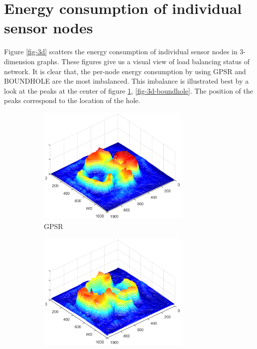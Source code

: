 \section{Energy consumption of individual sensor nodes}
Figure \ref{fig-3d} scatters the energy consumption of individual sensor nodes in 3-dimension graphs. These figures give us a visual view of load balancing status of network. It is clear that, the per-node energy consumption by using GPSR and BOUNDHOLE are the most imbalanced. This imbalance is illustrated best by a look at the peaks at the center of figure \ref{fig-3d-gpsr}, \ref{fig-3d-boundhole}. The position of the peaks correspond to the location of the hole.
\begin{figure}[!htb]
\centering
\begin{subfigure}{0.5\textwidth}
  \centering
  \includegraphics[width=0.8\textwidth]{Chapter7/Chapter7Figs/gpsr-energy.eps}
  \caption{GPSR}
  \label{fig-3d-gpsr}
\end{subfigure}%
\begin{subfigure}{0.5\textwidth}
  \centering
  \includegraphics[width=0.8\textwidth]{Chapter7/Chapter7Figs/boundhole-energy.eps}

\end{subfigure}
\end{figure}
